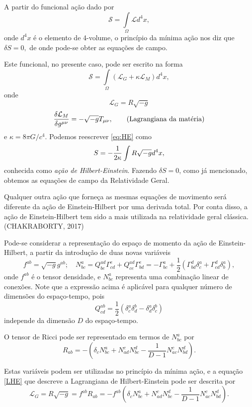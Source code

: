 \documentclass[a4,11pt]{report}
\begin{document}
A partir do funcional ação dado por \[\mathcal{S} = \int\limits_{\Omega} \mathcal{L} d^4 x,\] onde $d^4x$ é o elemento de 4-volume, o princípio da mínima ação nos diz que $\delta S = 0,$ de onde pode-se obter as equações de campo. 

Este funcional, no presente caso, pode ser escrito na forma 
\begin{equation}\label{eq:HE}
\mathcal{S} = \int\limits_{\Omega} (\mathcal{L}_G + \kappa\mathcal{L}_M) d^4x,
\end{equation}
onde
\begin{equation}\label{LHE}
\mathcal{L}_G = R \sqrt{-g} \tag{Lagrangiana de Einstein-Hilbert}
\end{equation}
\[
{\delta\mathcal{L}_M \over \delta g^{\mu\nu}} = -\sqrt{-g}T_{\mu\nu}, \tag{Lagrangiana da matéria}
\]
 e $\kappa = 8 \pi G/c^4.$ Podemos reescrever \ref{eq:HE} como
 \[
 S= - {1 \over 2\kappa}\int R \sqrt{-g} d^4x,
 \]
 conhecida como \textit{ação de Hilbert-Einstein}. Fazendo $\delta S = 0$, como já mencionado, obtemos as equações de campo da Relatividade Geral.
 
 Qualquer outra ação que forneça as mesmas equações de movimento será diferente da ação de Einstein-Hilbert por uma derivada total. Por conta disso, a ação de Einstein-Hilbert tem sido a mais utilizada na relatividade geral clássica. (CHAKRABORTY, 2017)
 
Pode-se considerar a representação do espaço de momento da ação de Einstein-Hilbert, a partir da introdução de duas novas variáveis
\[
f^{ab} = \sqrt{-g}g^{ab}; \quad N^a_{bc} = Q^{ad}_{be} \Gamma^{e}_{cd} + Q^{ad}_{ce}\Gamma_{bd}^e = -\Gamma_{bc}^a + \dfrac{1}{2} \left( \Gamma^d_{bd} \delta^a_c + \Gamma^d_{cd} \delta^a_b \right),
\]
onde $f^{ab}$ é o tensor densidade, e $N^a_{bc}$ representa uma combinação linear de conexões. Note que a expressão acima é aplicável para qualquer número de dimensões do espaço-tempo, pois 
\[
Q^{ab}_{cd} = \dfrac{1}{2} \left( \delta^a_c \delta^b_d  - \delta^a_d \delta^b_c \right)\]
independe da dimensão $D$ do espaço-tempo.

O tensor de Ricci pode ser representado em termos de $N^a_{bc}$ por 
\[
R_{ab} = - \left( \delta_c N^a_{bc} + N^c_{ad} N^d_{bc} - \dfrac{1}{D-1} N^c_{ac} N^d_{bd} \right).
\]

Estas variáveis podem ser utilizadas no princípio da mínima ação, e a equação \ref{LHE} que descreve a Lagrangiana de Hilbert-Einstein pode ser descrita por
\[
\mathcal{L}_G = R \sqrt{-g} = f^{ab} R_{ab} = -f^{ab} \left( \delta_c N^a_{bc} + N^c_{ad} N^d_{bc} - \dfrac{1}{D-1} N^c_{ac} N^d_{bd} \right).
\]
\end{document}
